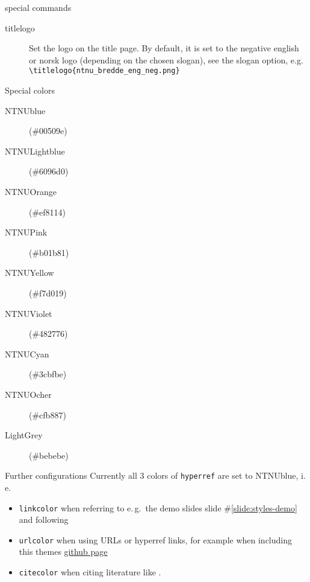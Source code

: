 \documentclass[aspectratio=169]{beamer}
\begin{document}
		\begin{frame}[fragile]{special commands}
			\begin{description}
				\item[titlelogo]
				Set the logo on the title page. By default, it is set to the negative english or norsk logo (depending on the chosen slogan), see the slogan option, e.g.\,
				\lstinline!\titlelogo{ntnu_bredde_eng_neg.png}!
			\end{description}
		\end{frame}
		\begin{frame}{Special colors}
			\begin{description}
				\item[{\color{NTNUBlue} NTNUblue}] (\#{\color{NTNUBlue}00509e})
				\item[{\color{NTNULightblue} NTNULightblue}] (\#{\color{NTNULightblue}6096d0})
				\item[{\color{NTNUOrange} NTNUOrange}] (\#{\color{NTNUOrange}ef8114})
				\item[{\color{NTNUPink} NTNUPink}] (\#{\color{NTNUPink}b01b81})
				\item[{\color{NTNUYellow} NTNUYellow}] (\#{\color{NTNUYellow}f7d019})
				\item[{\color{NTNUViolet} NTNUViolet}] (\#{\color{NTNUViolet}482776})
				\item[{\color{NTNUCyan} NTNUCyan}] (\#{\color{NTNUCyan}3cbfbe})
				\item[{\color{NTNUOcher} NTNUOcher}] (\#{\color{NTNUOcher}cfb887})
				\item[{\color{LightGrey} LightGrey}] (\#{\color{LightGrey}bebebe})
			\end{description}
		\end{frame}
		\begin{frame}{Further configurations}
			Currently all 3 colors of \lstinline!hyperref! are set to {\color{NTNUBlue} NTNUblue}, i.\,e.\
			\begin{itemize}
				\item \lstinline!linkcolor! when referring to e.\,g.\ the demo slides slide \#\ref{slide:styles-demo} and following
				\item \lstinline!urlcolor! when using URLs or hyperref links, for example when including this themes \href{https://github.com/ntnu-tex/beamerthementnu}{github page}
				\item \lstinline!citecolor! when citing literature like \footfullcite{TeX-book}.
			\end{itemize}
		\end{frame}
\end{document}
